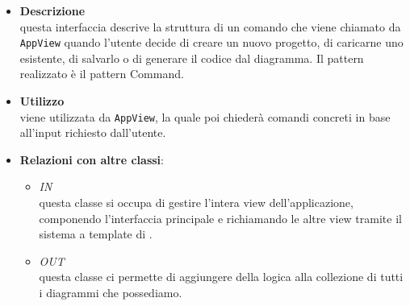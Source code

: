 \label{\nogloxy{swedesigner::client::model::ProjectCommand}}
\begin{itemize}
\item \textbf{Descrizione}\\
questa interfaccia descrive la struttura di un comando che viene chiamato da \texttt{AppView} quando l'utente decide di creare un nuovo progetto, di caricarne uno esistente, di salvarlo o di generare il codice dal diagramma. Il pattern realizzato è il pattern Command.
\item \textbf{Utilizzo}\\
viene utilizzata da \texttt{AppView}, la quale poi chiederà comandi concreti in base all'input richiesto dall'utente.
\item \textbf{Relazioni con altre classi}:
\begin{itemize}
\item \textit{IN} \hyperref[\nogloxy{swedesigner::client::view::AppView}]{}\\
questa classe si occupa di gestire l'intera view dell'applicazione, componendo l'interfaccia principale e richiamando le altre view tramite il sistema a template di \backbonejs{}.
\item \textit{OUT} \hyperref[\nogloxy{swedesigner::client::model::ProjectModel}]{}\\
questa classe ci permette di aggiungere della logica alla collezione di tutti i diagrammi che possediamo.
\end{itemize}
\end{itemize}

